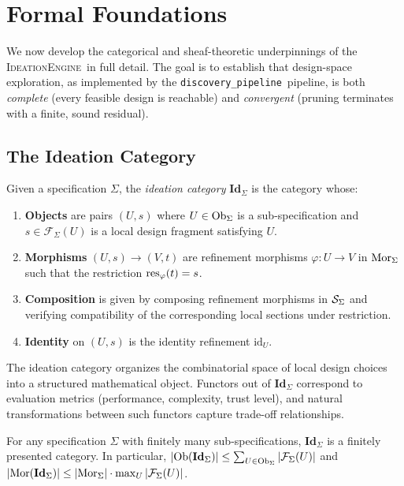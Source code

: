 \documentclass[11pt]{article}
\newcommand{\IdeationEngine}{\textsc{IdeationEngine}}
\newcommand{\DiscPipe}{\texttt{discovery\_pipeline}}
\begin{document}
\section{Formal Foundations}\label{sec:formal}

We now develop the categorical and sheaf-theoretic underpinnings of the
\IdeationEngine\ in full detail.  The goal is to establish that
design-space exploration, as implemented by the \DiscPipe\ pipeline, is
both \emph{complete} (every feasible design is reachable) and
\emph{convergent} (pruning terminates with a finite, sound residual).

\subsection{The Ideation Category}

\begin{definition}\label{def:ideation-cat}
Given a specification $\Sigma$, the \emph{ideation category}
$\mathbf{Id}_\Sigma$ is the category whose:
\begin{enumerate}[noitemsep]
  \item \textbf{Objects} are pairs $(U, s)$ where $U \in \mathrm{Ob}_\Sigma$
        is a sub-specification and $s \in \mathcal{F}_\Sigma(U)$ is a
        local design fragment satisfying $U$.
  \item \textbf{Morphisms} $(U, s) \to (V, t)$ are refinement morphisms
        $\varphi\colon U \to V$ in $\mathrm{Mor}_\Sigma$ such that the
        restriction $\mathrm{res}_\varphi(t) = s$.
  \item \textbf{Composition} is given by composing refinement morphisms
        in $\mathcal{S}_\Sigma$ and verifying compatibility of the corresponding
        local sections under restriction.
  \item \textbf{Identity} on $(U, s)$ is the identity refinement
        $\mathrm{id}_U$.
\end{enumerate}
\end{definition}

The ideation category organizes the combinatorial space of local design
choices into a structured mathematical object.  Functors out of
$\mathbf{Id}_\Sigma$ correspond to evaluation metrics (performance,
complexity, trust level), and natural transformations between such
functors capture trade-off relationships.

\begin{proposition}\label{prop:finite-pres}
For any specification $\Sigma$ with finitely many sub-specifications,
$\mathbf{Id}_\Sigma$ is a finitely presented category.  In particular,
$|\mathrm{Ob}(\mathbf{Id}_\Sigma)| \leq \sum_{U \in \mathrm{Ob}_\Sigma}
|\mathcal{F}_\Sigma(U)|$ and $|\mathrm{Mor}(\mathbf{Id}_\Sigma)| \leq
|\mathrm{Mor}_\Sigma| \cdot \max_U |\mathcal{F}_\Sigma(U)|$.
\end{proposition}
\end{document}
